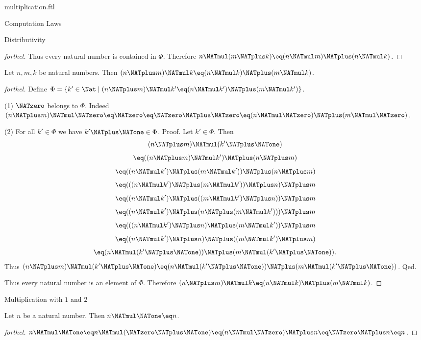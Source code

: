 \documentclass{naproche-library}
\begin{document}
\begin{smodule}[title=Multiplication]{multiplication.ftl}
\begin{sfragment}{Computation Laws}
\begin{sfragment}{Distributivity}
\begin{proof}[forthel]
      Thus every natural number is contained in $\Phi$.
      Therefore $n \NATmul (m \NATplus k) \eq (n \NATmul m) \NATplus (n \NATmul k)$.
    \end{proof}

    \begin{proposition}[forthel,id=ARITHMETIC_06_5742967566368768]
      Let $n, m, k$ be natural numbers.
      Then $(n \NATplus m) \NATmul k \eq (n \NATmul k) \NATplus (m \NATmul k)$.
    \end{proposition}
    \begin{proof}[forthel]
      Define $\Phi = \{ k' \in \Nat \mid (n \NATplus m) \NATmul k' \eq (n \NATmul k') \NATplus (m \NATmul k') \}$.

      (1) $\NATzero$ belongs to $\Phi$.
      Indeed $(n \NATplus m) \NATmul \NATzero
        \eq \NATzero
        \eq \NATzero \NATplus \NATzero
        \eq (n \NATmul \NATzero) \NATplus (m \NATmul \NATzero)$.

      (2) For all $k' \in \Phi$ we have $k' \NATplus \NATone \in \Phi$. \newline
      Proof.
        Let $k' \in \Phi$.
        Then
        \[  (n \NATplus m) \NATmul (k' \NATplus \NATone)                        \]
        \[    \eq ((n \NATplus m) \NATmul k') \NATplus (n \NATplus m)              \]
        \[    \eq ((n \NATmul k') \NATplus (m \NATmul k')) \NATplus (n \NATplus m)   \]
        \[    \eq (((n \NATmul k') \NATplus (m \NATmul k')) \NATplus n) \NATplus m   \]
        \[    \eq ((n \NATmul k') \NATplus ((m \NATmul k') \NATplus n)) \NATplus m   \]
        \[    \eq ((n \NATmul k') \NATplus (n \NATplus (m \NATmul k'))) \NATplus m   \]
        \[    \eq (((n \NATmul k') \NATplus n) \NATplus (m \NATmul k')) \NATplus m   \]
        \[    \eq ((n \NATmul k') \NATplus n) \NATplus ((m \NATmul k') \NATplus m)   \]
        \[    \eq (n \NATmul (k' \NATplus \NATone)) \NATplus (m \NATmul (k' \NATplus \NATone)).  \]
        Thus $(n \NATplus m) \NATmul (k' \NATplus \NATone) \eq (n \NATmul (k' \NATplus \NATone)) \NATplus (m \NATmul (k' \NATplus \NATone))$.
      Qed.

      Thus every natural number is an element of $\Phi$.
      Therefore $(n \NATplus m) \NATmul k \eq (n \NATmul k) \NATplus (m \NATmul k)$.
    \end{proof}
  \end{sfragment}

  \begin{sfragment}{Multiplication with $1$ and $2$}
    \begin{proposition}[forthel,id=ARITHMETIC_06_2910559821365248]
      Let $n$ be a natural number.
      Then $n \NATmul \NATone \eq n$.
    \end{proposition}
    \begin{proof}[forthel]
      $n \NATmul \NATone
        \eq n \NATmul (\NATzero \NATplus \NATone)
        \eq (n \NATmul \NATzero) \NATplus n
        \eq \NATzero \NATplus n
        \eq n$.
    \end{proof}


\end{sfragment}
\end{sfragment}
\end{smodule}
\end{document}

